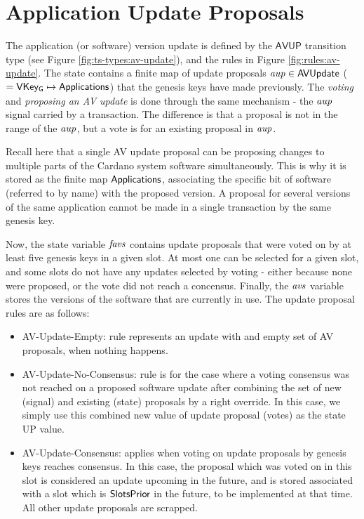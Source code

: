 \section{Application Update Proposals}
\label{sec:app-proposals}

The application (or software) version update is defined by the $\mathsf{AVUP}$
transition type (see Figure \ref{fig:ts-types:av-update}), and the rules in
Figure \ref{fig:rules:av-update}.
The state contains a finite map of update proposals
$\mathit{aup} \in \mathsf{AVUpdate}$ ($= \mathsf{VKey_G} \mapsto \mathsf{Applications}$) that the genesis keys have
made previously.
The \textit{voting} and \textit{proposing an AV update} is done through the same
mechanism - the $\mathit{aup}$ signal carried by a transaction. The difference
is that a proposal is not in the
range of the $\mathit{aup}$, but a vote is for an existing proposal
in $\mathit{aup}$.

Recall here that a single AV update proposal can be
proposing changes to multiple parts of the Cardano system software simultaneously.
This is why it is stored as the finite map $\mathsf{Applications}$, associating the
specific bit of software (referred to by name) with the proposed version.
A proposal for several versions of the same application cannot be made in
a single transaction by the same genesis key.

Now, the state variable $\mathit{favs}$ contains update proposals that
were voted on by at least five genesis keys in a given slot.
At most one
can be selected for a given slot, and some slots do not have any
updates selected by voting - either because none were proposed, or the vote
did not reach a concensus. Finally, the $\mathit{avs}$ variable stores
the versions of the software that are currently in use. The update
proposal rules are as follows:

\begin{itemize}
  \item AV-Update-Empty: rule represents an update with
and empty set of AV proposals, when nothing happens.
  \item AV-Update-No-Consensus: rule
is for the case where a voting consensus was not reached on a proposed software
update after combining the set of new (signal) and existing (state) proposals
by a right override. In this case, we simply use this combined new value
of update proposal (votes) as the state UP value.
  \item AV-Update-Consensus: applies when voting on update proposals by genesis keys
reaches consensus. In this case, the proposal which was voted on in this slot
is considered an update upcoming in the future, and is stored associated
with a slot which is $\mathsf{SlotsPrior}$ in the future, to be implemented at that time.
All other update proposals are scrapped.
\end{itemize}

